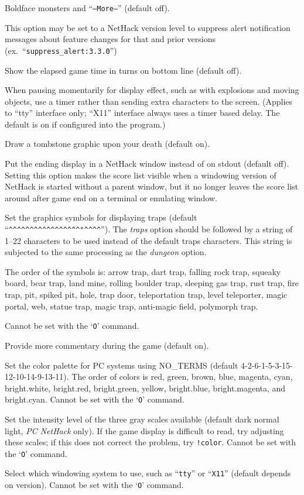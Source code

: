 Boldface monsters and ``{\tt --More--}'' (default off).
\item[\ib{suppress\_alert}]
This option may be set to a NetHack version level to suppress
alert notification messages about feature changes for that 
and prior versions (ex.\ ``{\tt suppress\_alert:3.3.0}'')
\item[\ib{time}]
Show the elapsed game time in turns on bottom line (default off).
\item[\ib{timed\_delay}]
When pausing momentarily for display effect, such as with explosions and
moving objects, use a timer rather than sending extra characters to the
screen.  (Applies to ``tty'' interface only; ``X11'' interface always
uses a timer based delay.  The default is on if configured into the
program.)
\item[\ib{tombstone}]
Draw a tombstone graphic upon your death (default on).
\item[\ib{toptenwin}]
Put the ending display in a NetHack window instead of on stdout (default off).
Setting this option makes the score list visible when a windowing version
of NetHack is started without a parent window, but it no longer leaves
the score list around after game end on a terminal or emulating window.
\item[\ib{traps}]
Set the graphics symbols for displaying traps (default
``\verb&^^^^^^^^^^^^^^^^^"^^^^&'').
The {\it traps\/} option should be followed by a string of 1--22
characters to be used instead of the default traps characters.
This string is subjected to the same processing as the {\it dungeon\/} option.

The order of the symbols is:
arrow trap, dart trap, falling rock trap, squeaky board, bear trap,
land mine, rolling boulder trap, sleeping gas trap, rust trap, fire trap,
pit, spiked pit, hole, trap door, teleportation trap, level teleporter,
magic portal, web, statue trap, magic trap, anti-magic field, polymorph trap.

Cannot be set with the `{\tt O}' command.
\item[\ib{verbose}]
Provide more commentary during the game (default on).
\item[\ib{videocolors}]
\begin{sloppypar}
Set the color palette for PC systems using NO\_TERMS
(default 4-2-6-1-5-3-15-12-10-14-9-13-11).
The order of colors is red, green, brown, blue, magenta, cyan,
bright.white, bright.red, bright.green, yellow, bright.blue,
bright.magenta, and bright.cyan.
Cannot be set with the `{\tt O}' command.
\end{sloppypar}
\item[\ib{videoshades}]
Set the intensity level of the three gray scales available
(default dark normal light, {\it PC\/ NetHack\/} only).
If the game display is difficult to read, try adjusting these scales;
if this does not correct the problem, try {\tt !color}.
Cannot be set with the `{\tt O}' command.
\item[\ib{windowtype}]
Select which windowing system to use, such as ``{\tt tty}'' or ``{\tt X11}''
(default depends on version).
Cannot be set with the `{\tt O}' command.
\elist

